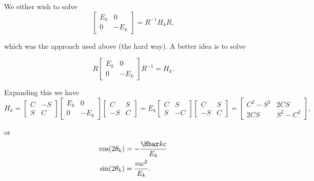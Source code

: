 {We either wish to solve
\begin{dmath}\label{eqn:qmLecture9Problems:540}
\begin{bmatrix}
E_k & 0 \\
0 & -E_k
\end{bmatrix}
=
R^{-1} H_k R,
\end{dmath}

which was the approach used above (the hard way).  A better idea is to solve

\begin{dmath}\label{eqn:qmLecture9Problems:560}
R
\begin{bmatrix}
E_k & 0 \\
0 & -E_k
\end{bmatrix}
R^{-1}
=
H_k.
\end{dmath}

Expanding this we have
\begin{dmath}\label{eqn:qmLecture9Problems:580}
H_k
=
\begin{bmatrix}
C & -S \\
S & C
\end{bmatrix}
\begin{bmatrix}
E_k & 0 \\
0 & -E_k
\end{bmatrix}
\begin{bmatrix}
C & S \\
-S & C
\end{bmatrix}
=
E_k
\begin{bmatrix}
C & S \\
S & -C
\end{bmatrix}
\begin{bmatrix}
C & S \\
-S & C
\end{bmatrix}
=
\begin{bmatrix}
C^2 - S^2 & 2 C S \\
2 C S & S^2 - C^2
\end{bmatrix},
\end{dmath}

or
\begin{dmath}\label{eqn:qmLecture9Problems:600}
\begin{aligned}
\cos(2 \theta_k) &= - \frac{\Hbar k c}{E_k} \\
\sin(2 \theta_k) &= \frac{m c^2}{E_k}.
\end{aligned}
\end{dmath}
} %


